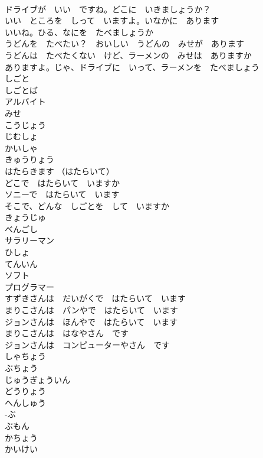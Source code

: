 \documentclass[8pt]{extreport}
\begin{document}
\begin{CJK}{UTF8}{min}
\\	ドライブが　いい　ですね。どこに　いきましょうか？	
\\	いい　ところを　しって　いますよ。いなかに　あります	
\\	いいね。ひる、なにを　たべましょうか	
\\	うどんを　たべたい？　おいしい　うどんの　みせが　あります	
\\	うどんは　たべたくない　けど、ラーメンの　みせは　ありますか	
\\	ありますよ。じゃ、ドライブに　いって、ラーメンを　たべましょう	
\\	しごと	
\\	しごとば	
\\	アルバイト	
\\	みせ	
\\	こうじょう	
\\	じむしょ	
\\	かいしゃ	
\\	きゅうりょう	
\\	はたらきます （はたらいて）	
\\	どこで　はたらいて　いますか	
\\	ソニーで　はたらいて　います	
\\	そこで、どんな　しごとを　して　いますか	
\\	きょうじゅ	
\\	べんごし	
\\	サラリーマン	
\\	ひしょ	
\\	てんいん	
\\	ソフト	
\\	プログラマー	
\\	すずきさんは　だいがくで　はたらいて　います	
\\	まりこさんは　パンやで　はたらいて　います	
\\	ジョンさんは　ほんやで　はたらいて　います	
\\	まりこさんは　はなやさん　です	
\\	ジョンさんは　コンピューターやさん　です	
\\	しゃちょう	
\\	ぶちょう	
\\	じゅうぎょういん	
\\	どうりょう	
\\	へんしゅう	
\\	-ぶ	
\\	ぶもん	
\\	かちょう	
\\	かいけい	

\end{CJK}
\end{document}
